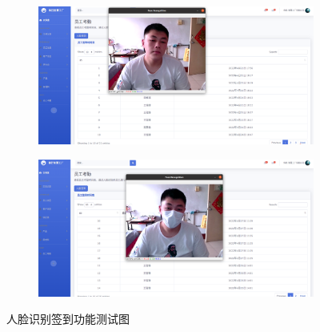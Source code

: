 \begin{figure}[H]
    \centering
    \begin{subfigure}{.45\textwidth}
        \centering
        \includegraphics[width=\textwidth]{figures/6facerecerror.png}
        \label{fig:fcrcgnt}
    \end{subfigure}
    \qquad
    \begin{subfigure}{.45\textwidth}
        \centering
        \includegraphics[width=\textwidth]{figures/6maskedfacerec.png}
        \label{fig:mskdfcrcgnt}
    \end{subfigure}
    \caption{人脸识别签到功能测试图}
    \label{fig:fcrcgnttst}
\end{figure}